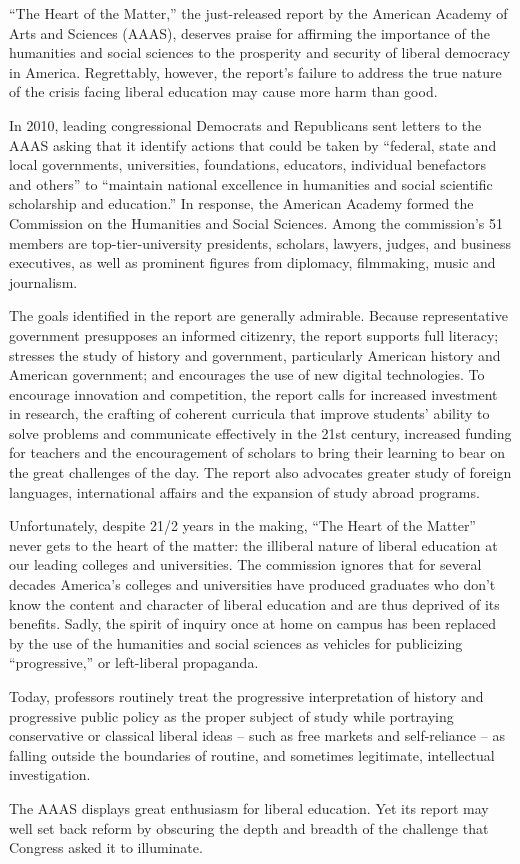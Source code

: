 ``The Heart of the Matter,'' the just-released report by the American Academy of Arts and Sciences (AAAS), deserves praise for affirming the importance of the humanities and social sciences to the prosperity and security of liberal democracy   in America. Regrettably, however, the report's failure to address the true nature of the crisis facing liberal education may cause more harm than good.


In 2010, leading congressional Democrats and Republicans sent letters to the AAAS asking that it identify actions that could be taken by ``federal, state and local governments, universities, foundations, educators, individual benefactors and others'' to ``maintain national excellence in humanities and social scientific scholarship and education.'' In response, the American Academy formed the Commission on the Humanities and Social Sciences. Among the commission's 51 members are top-tier-university presidents, scholars, lawyers, judges, and business executives, as well as prominent figures from diplomacy, filmmaking, music and journalism.


The goals identified in the report are generally admirable. Because representative government presupposes an informed citizenry, the report supports full literacy; stresses the study of history and government, particularly American history and American government; and encourages the use of new digital technologies. To encourage innovation and competition, the report calls for increased investment in research, the crafting of coherent curricula that improve students' ability to solve problems and communicate effectively in the 21st century, increased funding for teachers and the encouragement of scholars to bring their learning to bear on the great challenges of the day. The report also advocates greater study of foreign languages, international affairs and the expansion of study abroad programs.


Unfortunately, despite 21/2 years in the making, ``The Heart of the Matter'' never gets to the heart of the matter: the illiberal nature of liberal education at our leading colleges and universities. The commission ignores that for several decades America's colleges and universities have produced graduates who don't know the content and character of liberal education and are thus deprived of its benefits. Sadly, the spirit of inquiry once at home on campus has been replaced by the use  of the humanities and social sciences as vehicles for publicizing ``progressive,'' or left-liberal propaganda.


Today, professors routinely treat the progressive interpretation of history and progressive public policy as the proper subject of study while portraying conservative or classical liberal ideas – such as free markets and self-reliance – as falling outside the boundaries of routine, and sometimes legitimate, intellectual investigation.


The AAAS displays great enthusiasm for liberal education. Yet its report may well set back reform by obscuring the depth and breadth of the challenge that Congress asked it to illuminate.
